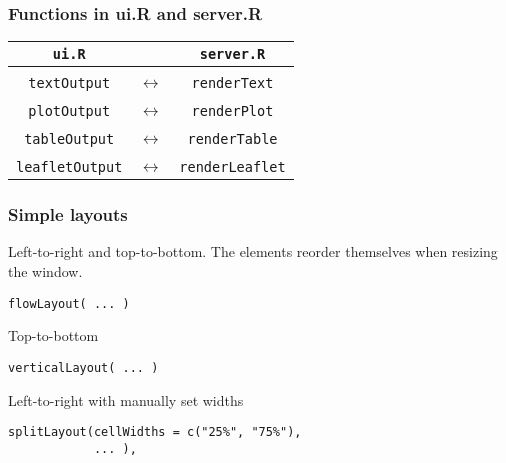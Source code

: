 \documentclass{beamer}
\begin{document}
	\begin{frame}[fragile]
		\frametitle{Functions in ui.R and server.R}
		\begin{center}
		\begin{tabular}{ c c c }
		\verb|ui.R| & & \verb|server.R| \\
		\hline
		\\
		\verb|textOutput| & $\leftrightarrow$ & \verb|renderText| \\
		\\
		\verb|plotOutput| & $\leftrightarrow$ & \verb|renderPlot| \\
		\\
		\verb|tableOutput| & $\leftrightarrow$ & \verb|renderTable| \\
		\\
		\verb|leafletOutput| & $\leftrightarrow$ & \verb|renderLeaflet| \\ 
		\end{tabular}
		\end{center}

	\end{frame}

	\begin{frame}[fragile]
		\frametitle{Simple layouts}
		
		Left-to-right and top-to-bottom. The elements reorder themselves when resizing the window.
		\begin{exampleblock}{}
		\begin{BVerbatim}
flowLayout( ... )
		\end{BVerbatim}
		\end{exampleblock}{}

		\vspace{1em}

		Top-to-bottom
		\begin{exampleblock}{}
		\begin{BVerbatim}
verticalLayout( ... )
		\end{BVerbatim}
		\end{exampleblock}{}

		\vspace{1em}

		Left-to-right with manually set widths
		\begin{exampleblock}{}
		\begin{lstlisting}
splitLayout(cellWidths = c("25%", "75%"),
            ... ),
		\end{lstlisting}
		\end{exampleblock}{}

	\end{frame}
\end{document}
